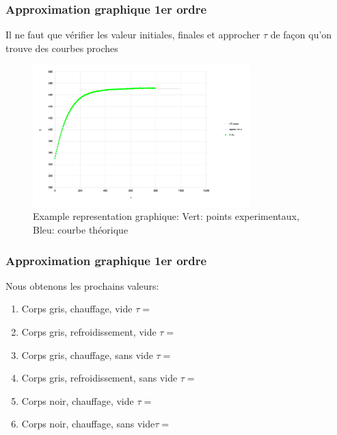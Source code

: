 \documentclass{beamer}
\begin{document}
\begin{frame}
\frametitle{Approximation graphique 1er ordre}

Il ne faut que vérifier les valeur initiales, finales et approcher $\tau$ de façon qu'on trouve des courbes proches

\begin{figure}
\includegraphics[width=0.75\textwidth]{Fig/t1-100-t2-82.png}
\caption{Example representation graphique: Vert: points experimentaux, Bleu: courbe théorique}
\end{figure}

\end{frame}





\begin{frame}
\frametitle{Approximation graphique 1er ordre}

Nous obtenons les prochains valeurs:
\begin{enumerate}
	\item{{\color{gray7}Corps gris}{\color{gray4}, {\color{red}chauffage}, vide} \hfill $\tau = $\hspace{4em} \newline}
	\item{{\color{gray7}Corps gris}{\color{gray4}, {\color{blue5}refroidissement}, vide} \hfill $\tau = $\hspace{4em} \newline}
	\item{{\color{gray7}Corps gris}{\color{gray4}, {\color{red}chauffage}, sans vide} \hfill $\tau = $\hspace{4em} \newline}
	\item{{\color{gray7}Corps gris}{\color{gray4}, {\color{blue5}refroidissement}, sans vide} \hfill $\tau = $\hspace{4em} \newline}
	\item{{\color{black}Corps noir}{\color{gray4}, {\color{red}chauffage}, vide} \hfill $\tau = $\hspace{4em} \newline}
	\item{{\color{black}Corps noir}{\color{gray4}, {\color{red}chauffage}, sans vide}\hfill $\tau = $\hspace{4em} \newline}
\end{enumerate}
\end{frame}
\end{document}

